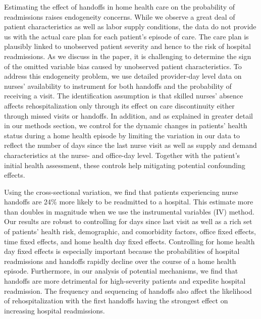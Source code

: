 \documentclass[final,12pt, notitlepage]{article}
\begin{document}
Estimating the effect of handoffs in home health care on the probability of readmissions raises endogeneity concerns.
While we observe a great deal of patient characteristics as well as labor supply conditions, the data do not provide us with the actual care plan for each patient's episode of care. The care plan is plausibly linked to unobserved patient severity and hence to the risk of hospital readmissions. As we discuss in the paper, it is challenging to determine the sign of the omitted variable bias caused by unobserved patient characteristics.
To address this endogeneity problem, we use detailed provider-day level data on nurses' availability to instrument for both handoffs and the probability of receiving a visit. The identification assumption is that skilled nurses' absence affects rehospitalization only through its effect on care discontinuity either through missed visits or handoffs. In addition, and as explained in greater detail in our methods section, we control for the dynamic changes in patients' health status during a home health episode by limiting the variation in our data to reflect the number of days since the last nurse visit as well as supply and demand characteristics at the nurse- and office-day level. Together with the patient's initial health assessment, these controls help mitigating potential confounding effects.

Using the cross-sectional variation,
we find that patients experiencing nurse handoffs are 24\% more likely to be readmitted to a hospital.
This estimate more than doubles in magnitude when we use the instrumental variables (IV) method.
Our results are robust to controlling for days since last visit as well as a rich set of patients' health risk, demographic, and comorbidity factors, office fixed effects, time fixed effects, and home health day fixed effects.
Controlling for home health day fixed effects is especially important because the probabilities of hospital readmissions and handoffs rapidly decline over the course of a home health episode.
Furthermore, in our analysis of potential mechanisms, we find that handoffs are more detrimental for high-severity patients and expedite hospital readmission. The frequency and sequencing of handoffs also affect the likelihood of rehospitalization with the first handoffs having the strongest effect on increasing hospital readmissions.
\end{document}
